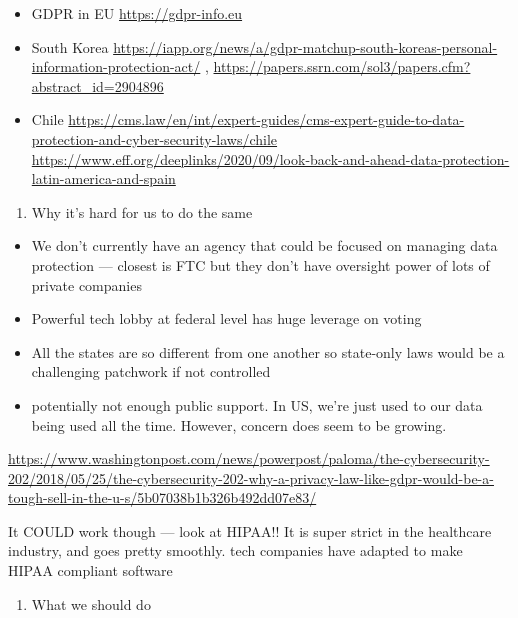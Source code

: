 \documentclass[water,article,submit,moreauthors,pdftex]{mdpi}
\providecommand{\tightlist}{%
  \setlength{\itemsep}{0pt}\setlength{\parskip}{4pt}}
\begin{document}
\begin{itemize}
\tightlist
\item
  GDPR in EU \url{https://gdpr-info.eu}
\item
  South Korea
  \url{https://iapp.org/news/a/gdpr-matchup-south-koreas-personal-information-protection-act/}
  , \url{https://papers.ssrn.com/sol3/papers.cfm?abstract_id=2904896}
\item
  Chile
  \url{https://cms.law/en/int/expert-guides/cms-expert-guide-to-data-protection-and-cyber-security-laws/chile}
  \url{https://www.eff.org/deeplinks/2020/09/look-back-and-ahead-data-protection-latin-america-and-spain}
\end{itemize}

\begin{enumerate}
\def\labelenumi{\arabic{enumi}.}
\setcounter{enumi}{4}
\tightlist
\item
  Why it's hard for us to do the same
\end{enumerate}

\begin{itemize}
\tightlist
\item
  We don't currently have an agency that could be focused on managing
  data protection --- closest is FTC but they don't have oversight power
  of lots of private companies
\item
  Powerful tech lobby at federal level has huge leverage on voting
\item
  All the states are so different from one another so state-only laws
  would be a challenging patchwork if not controlled
\item
  potentially not enough public support. In US, we're just used to our
  data being used all the time. However, concern does seem to be
  growing.
\end{itemize}

\url{https://www.washingtonpost.com/news/powerpost/paloma/the-cybersecurity-202/2018/05/25/the-cybersecurity-202-why-a-privacy-law-like-gdpr-would-be-a-tough-sell-in-the-u-s/5b07038b1b326b492dd07e83/}

It COULD work though --- look at HIPAA!! It is super strict in the
healthcare industry, and goes pretty smoothly. tech companies have
adapted to make HIPAA compliant software

\begin{enumerate}
\def\labelenumi{\arabic{enumi}.}
\setcounter{enumi}{6}
\tightlist
\item
  What we should do
\end{enumerate}
\end{document}
